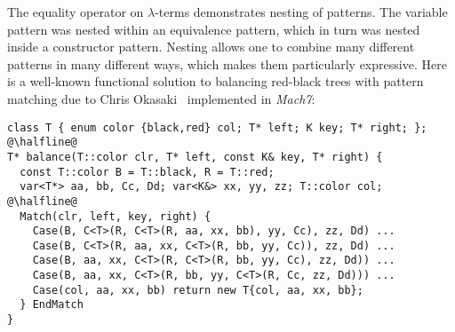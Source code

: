 %
%

The equality operator on $\lambda$-terms demonstrates nesting of patterns.
The variable pattern was nested within 
an equivalence pattern, which in turn was nested inside a constructor pattern. 
Nesting allows one to combine many different patterns in many different ways, 
which makes them particularly expressive. Here is a well-known functional 
solution to balancing red-black trees with pattern matching due to Chris 
Okasaki~\cite[]{okasaki1999purely} implemented in \emph{Mach7}:

\begin{lstlisting}
class T { enum color {black,red} col; T* left; K key; T* right; };
@\halfline@
T* balance(T::color clr, T* left, const K& key, T* right) {
  const T::color B = T::black, R = T::red;
  var<T*> aa, bb, Cc, Dd; var<K&> xx, yy, zz; T::color col;
@\halfline@
  Match(clr, left, key, right) {
    Case(B, C<T>(R, C<T>(R, aa, xx, bb), yy, Cc), zz, Dd) ...
    Case(B, C<T>(R, aa, xx, C<T>(R, bb, yy, Cc)), zz, Dd) ...
    Case(B, aa, xx, C<T>(R, C<T>(R, bb, yy, Cc), zz, Dd)) ...
    Case(B, aa, xx, C<T>(R, bb, yy, C<T>(R, Cc, zz, Dd))) ...
    Case(col, aa, xx, bb) return new T{col, aa, xx, bb};
  } EndMatch
}
\end{lstlisting}

